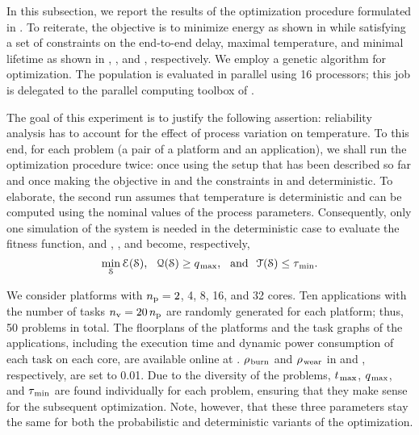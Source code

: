 In this subsection, we report the results of the optimization procedure formulated in .
To reiterate, the objective is to minimize energy as shown in  while satisfying a set of constraints on the end-to-end delay, maximal temperature, and minimal lifetime as shown in , , and , respectively.
We employ a genetic algorithm for optimization.
The population is evaluated in parallel using 16 processors; this job is delegated to the parallel computing toolbox of  \cite{matlab}.

The goal of this experiment is to justify the following assertion: reliability analysis has to account for the effect of process variation on temperature.
To this end, for each problem (a pair of a platform and an application), we shall run the optimization procedure twice: once using the setup that has been described so far and once making the objective in  and the constraints in  and  deterministic.
To elaborate, the second run assumes that temperature is deterministic and can be computed using the nominal values of the process parameters.
Consequently, only one simulation of the system is needed in the deterministic case to evaluate the fitness function, and , , and  become, respectively,
\[
  \min_{\EuScript{S}} \EuScript{E}(\EuScript{S}), \hspace{0.7em} \EuScript{Q}(\EuScript{S}) \geq q_{\text{\kern0.1emmax}}, \hspace{0.7em} \text{and} \hspace{0.7em} \EuScript{T}(\EuScript{S}) \leq \tau_{\text{\kern0.1emmin}}.
\]


We consider platforms with ${n_\text{p}} = 2$, 4, 8, 16, and 32 cores.
Ten applications with the number of tasks ${n_\text{v}} = 20 \, {n_\text{p}}$ are randomly generated for each platform; thus, 50 problems in total.
The floorplans of the platforms and the task graphs of the applications, including the execution time and dynamic power consumption of each task on each core, are available online at \cite{sources}.
$\rho_{\text{\kern0.1emburn}}$ and $\rho_{\text{\kern0.1emwear}}$ in  and , respectively, are set to 0.01.
Due to the diversity of the problems, $t_{\text{\kern0.1emmax}}$, $q_{\text{\kern0.1emmax}}$, and $\tau_{\text{\kern0.1emmin}}$ are found individually for each problem, ensuring that they make sense for the subsequent optimization.
Note, however, that these three parameters stay the same for both the probabilistic and deterministic variants of the optimization.

